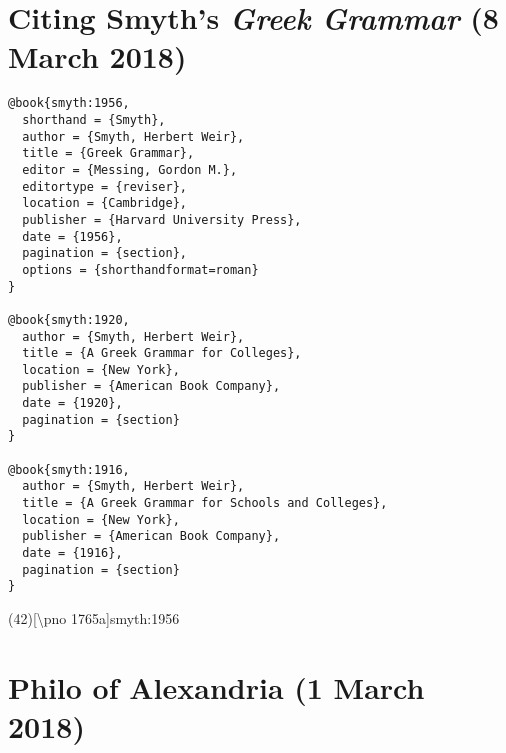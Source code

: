 \documentclass[a4paper]{article}
\newcommand*{\pno}{\textbackslash pno }
\begin{document}
\section{Citing Smyth's \emph{Greek Grammar} (8 March 2018)}

\begin{verbatim}
@book{smyth:1956,
  shorthand = {Smyth},
  author = {Smyth, Herbert Weir},
  title = {Greek Grammar},
  editor = {Messing, Gordon M.},
  editortype = {reviser},
  location = {Cambridge},
  publisher = {Harvard University Press},
  date = {1956},
  pagination = {section},
  options = {shorthandformat=roman}
}

@book{smyth:1920,
  author = {Smyth, Herbert Weir},
  title = {A Greek Grammar for Colleges},
  location = {New York},
  publisher = {American Book Company},
  date = {1920},
  pagination = {section}
}

@book{smyth:1916,
  author = {Smyth, Herbert Weir},
  title = {A Greek Grammar for Schools and Colleges},
  location = {New York},
  publisher = {American Book Company},
  date = {1916},
  pagination = {section}
}
\end{verbatim}

\examplecite(42)[\pno 1765a]{smyth:1956}
\exampleabbreviations
\examplebibliography
{}

\section{Philo of Alexandria (1 March 2018)}
\end{document}
